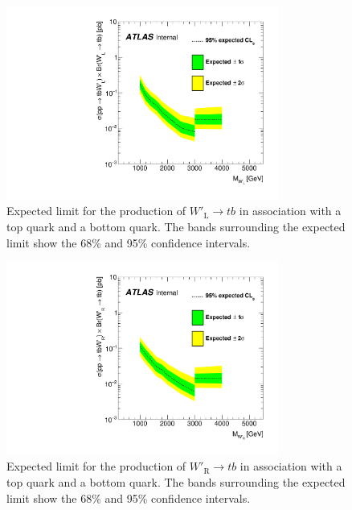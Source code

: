 \begin{figure}[H]
  \centering
  \includegraphics[width=0.8\textwidth]{images/ProfileLHFit/XSUpperLimits_Wp-LH.pdf}
  \caption{Expected limit for the production of $W'_{\text{L}}{\rightarrow}tb$ in association with a top quark and a bottom quark. The bands surrounding the expected limit show the 68\% and 95\% confidence intervals.}
  \label{fig:XSLimits_WpLH}
\end{figure}


\begin{figure}[H]
  \centering
  \includegraphics[width=0.8\textwidth]{images/ProfileLHFit/XSUpperLimits_Wp-RH.pdf}
  \caption{Expected limit for the production of $W'_{\text{R}}{\rightarrow}tb$ in association with a top quark and a bottom quark. The bands surrounding the expected limit show the 68\% and 95\% confidence intervals.}
  \label{fig:XSLimits_WpRH}
\end{figure}


